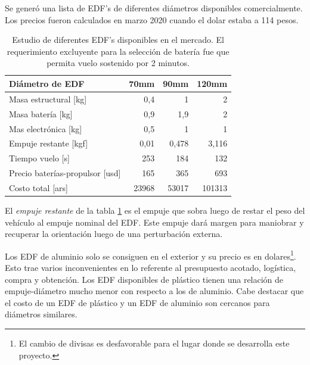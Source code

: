 \medskip

Se generó una lista de EDF's de diferentes diámetros disponibles comercialmente. Los precios fueron calculados en marzo 2020 cuando el dolar estaba a 114 pesos.

\begin{table}[!ht]
    \centering
    \begin{tabular}{l|r|r|r}
Diámetro de EDF    & \multicolumn{1}{l|}{70mm} & \multicolumn{1}{l|}{90mm} & \multicolumn{1}{l}{120mm} \\ \hline
    Masa estructural {[}kg{]}           & 0,4                       & 1                         & 2                          \\ \hline
    Masa batería       {[}kg{]}                 & 0,9                       & 1,9                       & 2                          \\ \hline
    Mas electrónica {[}kg{]}            & 0,5                       & 1                         & 1                          \\ \hline
    Empuje restante {[}kgf{]}           & 0,01                      & 0,478                     & 3,116                      \\ \hline
    Tiempo vuelo {[}s{]}                & 253              & 184              & 132                \\ \hline
    Precio baterías-propulsor {[}usd{]} & 165                   & 365                   & 693                   \\ \hline
    Costo total {[}ars{]}               & 23968              & 53017              & 101313                 \\ \hline
    \end{tabular}
    \caption{Estudio de diferentes EDF's disponibles en el mercado. El requerimiento excluyente para la selección de batería fue que permita vuelo sostenido por 2 minutos.}
    \label{tab:edfseleccion}
\end{table}


El \textit{empuje restante} de la tabla \ref{tab:edfseleccion} es el empuje que sobra luego de restar el peso del vehículo al empuje nominal del EDF. Este empuje dará margen para maniobrar y recuperar la orientación luego de una perturbación externa.

\medskip

Los EDF de aluminio solo se consiguen en el exterior y su precio es en dolares\footnote{El cambio de divisas es desfavorable para el lugar donde se desarrolla este proyecto.}. Esto trae varios inconvenientes en lo referente al presupuesto acotado, logística, compra y obtención. Los EDF
disponibles de plástico tienen una relación de empuje-diámetro mucho menor con respecto a
los de aluminio. Cabe destacar que el costo de un EDF de plástico y un EDF de aluminio son cercanos para diámetros similares.

